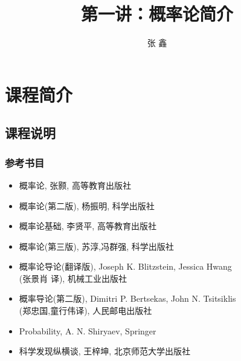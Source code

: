 
\title[概率论]{第一讲：概率论简介}
\author[张鑫 {\rm Email: xzhangseu@seu.edu.cn} ]{\large 张 鑫}
\date{}


{ 
  \begin{frame}
    \titlepage
  \end{frame}
}



\section{ 课程简介}
\subsection{课程说明}
\begin{frame}
	\frametitle{参考书目}
	\begin{itemize}[<+-|alert@+>]
		\item 概率论, 张颢, 高等教育出版社
	    \item 概率论(第二版), 杨振明, 科学出版社
	    \item 概率论基础, 李贤平, 高等教育出版社
		\item 概率论(第三版), 苏淳,冯群强, 科学出版社
		\item 概率论导论(翻译版), {\rm Joseph K. Blitzstein, Jessica Hwang}\\
	    (张景肖 译), 机械工业出版社
		\item 概率导论(第二版), {\rm Dimitri P. Bertsekas, John N. Tsitsiklis}\\  (郑忠国,童行伟译), 人民邮电出版社
		\item {\rm Probability, A. N. Shiryaev, Springer}
		\item 科学发现纵横谈, 王梓坤, 北京师范大学出版社
	\end{itemize}
\end{frame}




